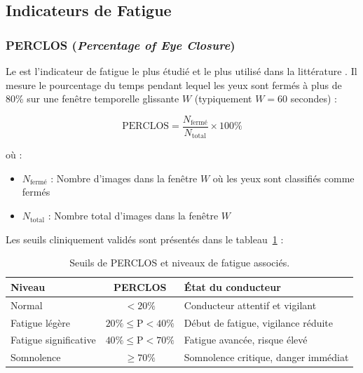 \subsection{Indicateurs de Fatigue}

\subsubsection{PERCLOS (\textit{Percentage of Eye Closure})}

Le  est l'indicateur de fatigue le plus étudié et le plus utilisé dans la littérature \cite{wierwille1994}. Il mesure le pourcentage du temps pendant lequel les yeux sont fermés à plus de 80\% sur une fenêtre temporelle glissante $W$ (typiquement $W = 60$ secondes) :

\begin{equation}
\boxed{
\text{PERCLOS} = \frac{N_{\text{fermé}}}{N_{\text{total}}} \times 100\%
}
\label{eq:perclos}
\end{equation}

où :
\begin{itemize}
    \item $N_{\text{fermé}}$ : Nombre d'images dans la fenêtre $W$ où les yeux sont classifiés comme fermés
    \item $N_{\text{total}}$ : Nombre total d'images dans la fenêtre $W$
\end{itemize}

Les seuils cliniquement validés sont présentés dans le tableau~\ref{tab:perclos_seuils} :

\begin{table}[H]
\centering
\caption{Seuils de PERCLOS et niveaux de fatigue associés.}
\label{tab:perclos_seuils}
\renewcommand{\arraystretch}{1.3}
\begin{tabular}{|l|c|l|}
\hline
\rowcolor{stellantisblue!15}
\textbf{Niveau} & \textbf{PERCLOS} & \textbf{État du conducteur} \\
\hline
Normal & $< 20\%$ & Conducteur attentif et vigilant \\
\hline
\rowcolor{alertyellow!30}
Fatigue légère & $20\% \leq \text{P} < 40\%$ & Début de fatigue, vigilance réduite \\
\hline
\rowcolor{alertorange!30}
Fatigue significative & $40\% \leq \text{P} < 70\%$ & Fatigue avancée, risque élevé \\
\hline
\rowcolor{alertred!30}
Somnolence & $\geq 70\%$ & Somnolence critique, danger immédiat \\
\hline
\end{tabular}
\end{table}

